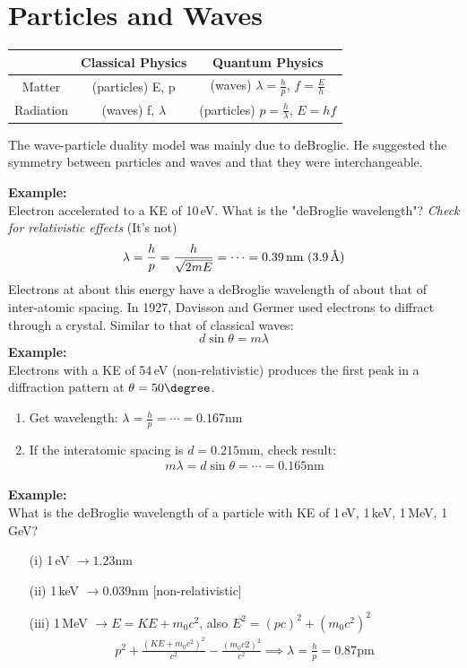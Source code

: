 \documentclass[a4paper, 11pt, normalem]{report}
\begin{document}
\section{Particles and Waves}
\begin{table}[H]
    \centering
    \begin{tabular}{|c|c|c|}
        \hline
        \rowcolor{lightgray} & Classical Physics & Quantum Physics \\
        \hline
        Matter & (particles) E, p & (waves) $\lambda = \frac{h}{p}$, $f = \frac{E}{h}$ \\
        \hline
        Radiation & (waves) f, $\lambda$ & (particles) $p = \frac{h}{\lambda}$, $E = hf$\\
        \hline
    \end{tabular}
\end{table}
The wave-particle duality model was mainly due to deBroglie.
He suggested the symmetry between particles and waves and that they were interchangeable.

\textbf{Example:}\\
Electron accelerated to a KE of 10\,eV.
What is the "deBroglie wavelength"?
\emph{Check for relativistic effects} (It's not)
\begin{equation}
    \lambda = \frac{h}{p} = \frac{h}{\sqrt{2mE}} = \cdots = 0.39\,\text{nm}~(3.9\,\text{\r{A}})
\end{equation}
Electrons at about this energy have a deBroglie wavelength of about that of inter-atomic spacing.
In 1927, Davisson and Germer used electrons to diffract through a crystal.
Similar to that of classical waves:
\begin{equation}
    d\sin{\theta} = m\lambda
\end{equation}
\textbf{Example:}\\
Electrons with a KE of 54\,eV (non-relativistic) produces the first peak in a diffraction pattern at $\theta = 50\degree$.
\begin{enumerate}
    \item Get wavelength: $\lambda = \frac{h}{p} = \cdots = 0.167$nm
    \item If the interatomic spacing is $d = 0.215$mm, check result:
        \begin{align}
            m\lambda = d\sin{\theta} = \cdots = 0.165\text{nm}
        \end{align}
\end{enumerate}
\textbf{Example:}\\
What is the deBroglie wavelength of a particle with KE of 1\,eV, 1\,keV, 1\,MeV, 1\,GeV?
\begin{enumerate}
    \item[(i)] 1\,eV $\rightarrow 1.23$nm
    \item[(ii)] 1\,keV $\rightarrow 0.039$nm [non-relativistic]
    \item[(iii)] 1\,MeV $\rightarrow E = KE + m_{0}c^{2}$, also $E^{2} = (pc)^{2} + (m_{0}c^{2})^{2}$
        \begin{align}
            p^{2} + \frac{(KE + m_{0}c^{2})^{2}}{c^{2}} - \frac{(m_{0}c{2})^{2}}{c^{2}} \implies \lambda = \frac{h}{p} = 0.87\text{pm}
        \end{align}
\end{enumerate}
\end{document}
